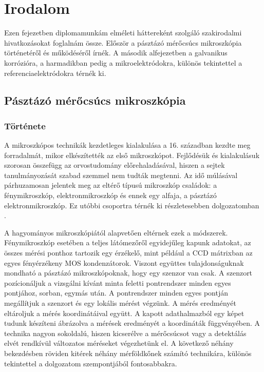\chapter{Irodalom}
\pagestyle{headings}

Ezen fejezetben diplomamunkám elméleti háttereként szolgáló szakirodalmi hivatkozásokat foglalnám össze. Először a pásztázó mérőcsúcs mikroszkópia történetéről és működéséről írnék. A második alfejezetben a galvanikus korrózióra, a harmadikban pedig a mikroelektródokra, különös tekintettel a referenciaelektródokra térnék ki.

\section{Pásztázó mérőcsúcs mikroszkópia}

\subsection{Története}

A mikroszkópos technikák kezdetleges kialakulása a 16. században kezdte meg forradalmát, mikor elkészítették az első mikroszkópot. Fejlődésük és kialakulásuk szorosan összefügg az orvostudomány előrehaladásával, hiszen a sejtek tanulmányozását szabad szemmel nem tudták megtenni. Az idő múlásával párhuzamosan jelentek meg az eltérő típusú mikroszkóp családok: a fénymikroszkóp, elektronmikroszkóp és ennek egy alfaja, a pásztázó elektronmikroszkóp. Ez utóbbi csoportra térnék ki részletesebben dolgozatomban \cite{masters2008history}. 

A hagyományos mikroszkópiától alapvetően eltérnek ezek a módszerek. Fénymikroszkóp esetében a teljes látómezőről egyidejűleg kapunk adatokat, az összes mérési ponthoz tartozik egy érzékelő, mint például a CCD mátrixban az egyes fényérzékeny MOS kondenzátorok. Viszont együttes tulajdonságuknak mondható a pásztázó mikroszkópoknak, hogy egy szenzor van csak. A szenzort pozícionáljuk a vizsgálni kívánt minta feletti pontrendszer minden egyes pontjához, sorban, egymás után. A pontrendszer minden egyes pontján megállítjuk a szenzort és egy lokális mérést végzünk. A mérés eredményét eltároljuk a mérés koordinátáival együtt. A kapott adathalmazból egy képet tudunk készíteni ábrázolva a mérések eredményét a koordináták függvényében. A technika nagyon sokoldalú, hiszen kicserélve a mérőcsúcsot vagy a detektálás elvét rendkívül változatos méréseket végezhetünk el. A következő néhány bekezdésben röviden kitérek néhány mérföldkőnek számító technikára, különös tekintettel a dolgozatom szempontjából fontosabbakra.
 
